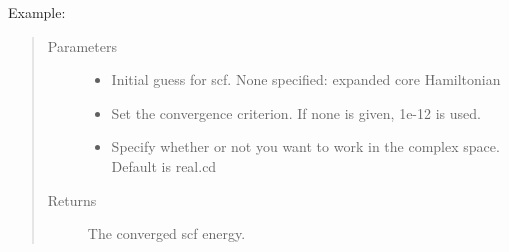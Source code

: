 \documentclass[letterpaper,10pt,english]{sphinxmanual}
\begin{document}
\begin{fulllineitems}
\begin{fulllineitems}
Example:

\begin{sphinxVerbatim}[commandchars=\\\{\}]
   
          
   
  
\end{sphinxVerbatim}
\begin{quote}\begin{description}
\item[{Parameters}] \leavevmode\begin{itemize}
\item {} 
 \textendash{} Initial guess for scf. None specified: expanded core Hamiltonian

\item {} 
 \textendash{} Set the convergence criterion. If none is given, 1e-12 is used.

\item {} 
 \textendash{} Specify whether or not you want to work in the complex space. Default is real.cd

\end{itemize}

\item[{Returns}] \leavevmode
The converged scf energy.

\end{description}\end{quote}

\end{fulllineitems}


\end{fulllineitems}
\end{document}
